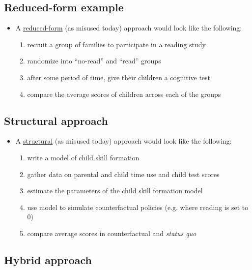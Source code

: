 \documentclass[11pt]{article}
\begin{document}
\subsection{Reduced-form example}
\label{sec:org848d374}

\begin{itemize}
\item A \uline{reduced-form} (as misused today) approach would look like the following:

\begin{enumerate}
\item recruit a group of families to participate in a reading study
\item randomize into ``no-read'' and ``read'' groups
\item after some period of time, give their children a cognitive test
\item compare the average scores of children across each of the groups
\end{enumerate}
\end{itemize}


\subsection{Structural approach}
\label{sec:orgdfe4df1}

\begin{itemize}
\item A \uline{structural} (as misused today) approach would look like the following:

\begin{enumerate}
\item write a model of child skill formation \cite{cunha_al2010}
\item gather data on parental and child time use and child test scores
\item estimate the parameters of the child skill formation model
\item use model to simulate counterfactual policies (e.g. where reading is set to 0)
\item compare average scores in counterfactual and \emph{status quo}
\end{enumerate}
\end{itemize}

\subsection{Hybrid approach}
\label{sec:orgffe791e}
\end{document}
